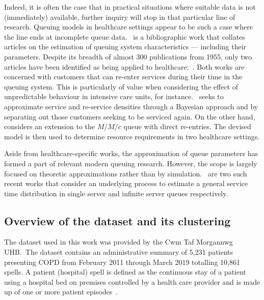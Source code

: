 \documentclass[11pt]{article}
\begin{document}
Indeed, it is often the case that in practical situations where suitable data is
not (immediately) available, further inquiry will stop in that particular line
of research. Queuing models in healthcare settings appear to be such a case
where the line ends at incomplete queue data.~\cite{Asanjarani2017} is a
bibliographic work that collates articles on the estimation of queuing system
characteristics --- including their parameters.  Despite its breadth of almost
300 publications from 1955, only two articles have been identified as being
applied to healthcare:~\cite{Mohammadi2012,Yom2014}.  Both works are concerned
with customers that can re-enter services during their time in the queuing
system. This is particularly of value when considering the effect of
unpredictable behaviour in intensive care units, for
instance.~\cite{Mohammadi2012} seeks to approximate service and re-service
densities through a Bayesian approach and by separating out those customers
seeking to be serviced again. On the other hand,~\cite{Yom2014} considers an
extension to the \(M/M/c\) queue with direct re-entries. The devised model is
then used to determine resource requirements in two healthcare settings.

Aside from healthcare-specific works, the approximation of
queue parameters has formed a part of relevant modern queuing research. However,
the scope is largely focused on theoretic approximations rather than by
simulation.~\cite{Djabali2018,Goldenshluger2016} are two such recent
works that consider an underlying process to estimate a general service time
distribution in single server and infinite server queues respectively.

\subsection{Overview of the dataset and its clustering}\label{subsec:overview}

The dataset used in this work was provided by the Cwm Taf Morgannwg UHB.\ The
dataset contains an administrative summary of 5,231 patients
presenting COPD from February 2011 through March 2019 totalling
10,861 spells. A patient (hospital) spell is defined as the
continuous stay of a patient using a hospital bed on premises controlled by a
health care provider and is made up of one or more patient
episodes~\cite{NHS2020}.
\end{document}
